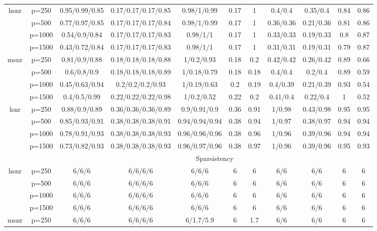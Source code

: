 \begin{table}[ht]
{\begin{tabular}{|c|c|ccccccccc|}
\midrule\multirow{4}[2]{*}{hsnr} & p=250 & 0.95/0.99/0.85 & 0.17/0.17/0.17/0.85 & 0.98/1/0.99 & 0.17 & 1 & 0.4/0.4 & 0.35/0.4 & 0.84 & 0.86 \\ 
   & p=500 & 0.77/0.97/0.85 & 0.17/0.17/0.17/0.84 & 0.98/1/0.99 & 0.17 & 1 & 0.36/0.36 & 0.21/0.36 & 0.81 & 0.86 \\ 
   & p=1000 & 0.54/0.9/0.84 & 0.17/0.17/0.17/0.83 & 0.98/1/1 & 0.17 & 1 & 0.33/0.33 & 0.19/0.33 & 0.8 & 0.87 \\ 
   & p=1500 & 0.43/0.72/0.84 & 0.17/0.17/0.17/0.83 & 0.98/1/1 & 0.17 & 1 & 0.31/0.31 & 0.19/0.31 & 0.79 & 0.87 \\ 
  \midrule\multirow{4}[2]{*}{msnr} & p=250 & 0.81/0.9/0.88 & 0.18/0.18/0.18/0.88 & 1/0.2/0.93 & 0.18 & 0.2 & 0.42/0.42 & 0.26/0.42 & 0.89 & 0.66 \\ 
   & p=500 & 0.6/0.8/0.9 & 0.18/0.18/0.18/0.89 & 1/0.18/0.79 & 0.18 & 0.18 & 0.4/0.4 & 0.2/0.4 & 0.89 & 0.59 \\ 
   & p=1000 & 0.45/0.63/0.94 & 0.2/0.2/0.2/0.93 & 1/0.19/0.63 & 0.2 & 0.19 & 0.4/0.39 & 0.21/0.39 & 0.93 & 0.54 \\ 
   & p=1500 & 0.4/0.5/0.99 & 0.22/0.22/0.22/0.98 & 1/0.2/0.52 & 0.22 & 0.2 & 0.41/0.4 & 0.22/0.4 & 1 & 0.52 \\ 
  \midrule\multirow{4}[2]{*}{lsnr} & p=250 & 0.88/0.9/0.89 & 0.36/0.36/0.36/0.89 & 0.9/0.91/0.9 & 0.36 & 0.91 & 1/0.98 & 0.43/0.98 & 0.95 & 0.95 \\ 
   & p=500 & 0.85/0.93/0.91 & 0.38/0.38/0.38/0.91 & 0.94/0.94/0.94 & 0.38 & 0.94 & 1/0.97 & 0.38/0.97 & 0.94 & 0.94 \\ 
   & p=1000 & 0.78/0.91/0.93 & 0.38/0.38/0.38/0.93 & 0.96/0.96/0.96 & 0.38 & 0.96 & 1/0.96 & 0.39/0.96 & 0.94 & 0.94 \\ 
   & p=1500 & 0.73/0.82/0.93 & 0.38/0.38/0.38/0.93 & 0.96/0.97/0.96 & 0.38 & 0.97 & 1/0.96 & 0.39/0.96 & 0.95 & 0.93 \\ 
   \midrule 
 \multicolumn{1}{|c}{} &       & \multicolumn{9}{c|}{Sparsistency} \\
\midrule\multirow{4}[2]{*}{hsnr} & p=250 & 6/6/6 & 6/6/6/6 & 6/6/6 & 6 & 6 & 6/6 & 6/6 & 6 & 6 \\ 
   & p=500 & 6/6/6 & 6/6/6/6 & 6/6/6 & 6 & 6 & 6/6 & 6/6 & 6 & 6 \\ 
   & p=1000 & 6/6/6 & 6/6/6/6 & 6/6/6 & 6 & 6 & 6/6 & 6/6 & 6 & 6 \\ 
   & p=1500 & 6/6/6 & 6/6/6/6 & 6/6/6 & 6 & 6 & 6/6 & 6/6 & 6 & 6 \\ 
  \midrule\multirow{4}[2]{*}{msnr} & p=250 & 6/6/6 & 6/6/6/6 & 6/1.7/5.9 & 6 & 1.7 & 6/6 & 6/6 & 6 & 6 \\ 

\end{tabular}}
\end{table}
